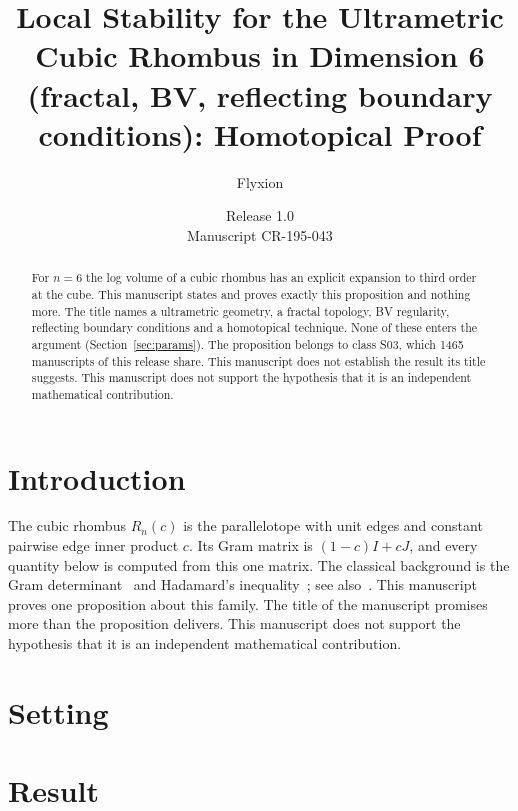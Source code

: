 \documentclass[11pt]{article}
\title{Local Stability for the Ultrametric Cubic Rhombus in Dimension 6 (fractal, BV, reflecting boundary conditions): Homotopical Proof}
\author{Flyxion}
\date{Release 1.0\\ Manuscript CR-195-043}
\begin{document}
\maketitle
\begin{abstract}
For $n=6$ the log volume of a cubic rhombus has an explicit expansion to third order at the cube. This manuscript states and proves exactly this proposition and nothing more. The title names a ultrametric geometry, a fractal topology, BV regularity, reflecting boundary conditions and a homotopical technique. None of these enters the argument (Section~\ref{sec:params}). The proposition belongs to class S03, which 1465 manuscripts of this release share. This manuscript does not establish the result its title suggests. This manuscript does not support the hypothesis that it is an independent mathematical contribution.
\end{abstract}

\section{Introduction}
The cubic rhombus $R_n(c)$ is the parallelotope with unit edges and constant pairwise edge inner product $c$. Its Gram matrix is $(1-c)I+cJ$, and every quantity below is computed from this one matrix. The classical background is the Gram determinant~\cite{gram} and Hadamard's inequality~\cite{hadamard}; see also~\cite{hj}.
This manuscript proves one proposition about this family. The title of the manuscript promises more than the proposition delivers. This manuscript does not support the hypothesis that it is an independent mathematical contribution.

\section{Setting}


\section{Result}

\end{document}
